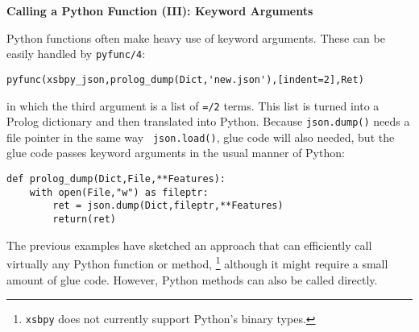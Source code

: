 \begin{example} \rm {\bf Calling a Python Function (III): Keyword Arguments}
  
\noindent
Python functions often make heavy use of keyword arguments.  These can
be easily handled by {\tt pyfunc/4}:
\begin{verbatim}
pyfunc(xsbpy_json,prolog_dump(Dict,'new.json'),[indent=2],Ret)
\end{verbatim}

\noindent
in which the third argument is a list of {\tt =/2} terms.  This list
is turned into a Prolog dictionary and then translated into Python.
Because {\tt json.dump()} needs a file pointer in the same way {\tt
  json.load()}, glue code will also needed, but the glue code passes
keyword arguments in the usual manner of Python:
\begin{verbatim}
def prolog_dump(Dict,File,**Features):
    with open(File,"w") as fileptr:
        ret = json.dump(Dict,fileptr,**Features)
        return(ret)
\end{verbatim}
\end{example}

The previous examples have sketched an approach that can efficiently
call virtually any Python function or method, \footnote{{\tt xsbpy}
  does not currently support Python's binary types.}  although it
might require a small amount of glue code.  However, Python methods can
also be called directly.

